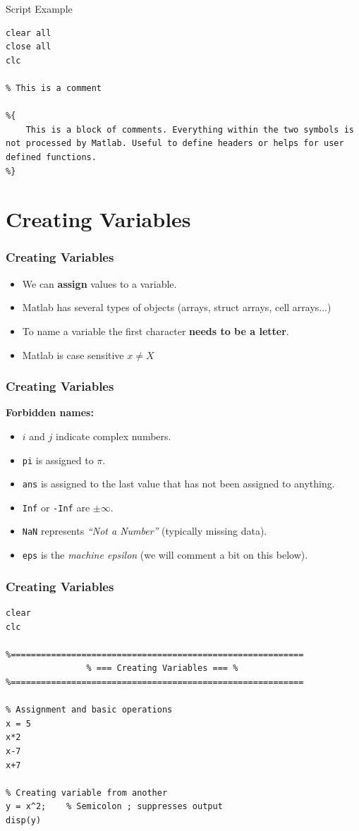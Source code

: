 \documentclass[11pt,xcolor={svgnames},aspectratio=169,usepdftitle=false,notheorems]{beamer}
\begin{document}
\begin{frame}[fragile]{Script Example}
\begin{lstlisting}
clear all
close all 
clc

% This is a comment

%{
    This is a block of comments. Everything within the two symbols is not processed by Matlab. Useful to define headers or helps for user defined functions.
%}
\end{lstlisting}
\end{frame}

\section{Creating Variables}

\begin{frame}
    \frametitle{Creating Variables}
    \begin{itemize}
        \item We can \alert{\textbf{assign}} values to a variable.
        \item Matlab has several types of objects (arrays, struct arrays, cell arrays...)
        \item To name a variable the first character \alert{\textbf{needs to be a letter}}.
        \item Matlab is case sensitive $x \neq X$
    \end{itemize}
\end{frame}

\begin{frame}[fragile]
    \frametitle{Creating Variables}
\alert{\textbf{Forbidden names:}}
\begin{itemize}
	\item $i$ and $j$ indicate complex numbers.
	\item \verb;pi; is assigned to $\pi$.
	\item \verb;ans; is assigned to the last value that has not been assigned to anything.
	\item \verb;Inf; or \verb;-Inf; are $\pm\infty$.
	\item \verb;NaN; represents \textit{``Not a Number''} (typically missing data).
	\item \verb;eps; is the \textit{machine epsilon} (we will comment a bit on this below).
\end{itemize}
\end{frame}

\begin{frame}[fragile]
    \frametitle{Creating Variables}
\begin{lstlisting}
clear
clc

%==========================================================
                % === Creating Variables === %
%==========================================================

% Assignment and basic operations
x = 5
x*2
x-7
x+7

% Creating variable from another
y = x^2;    % Semicolon ; suppresses output
disp(y)
\end{lstlisting}
\end{frame}
\end{document}
